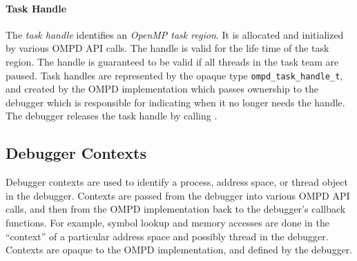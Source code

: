 \paragraph{Task Handle}
The \emph{task handle} identifies an \emph{OpenMP task region}.
It is allocated and initialized by various OMPD API calls.
The handle is valid for the life time of the task region.
The handle is guaranteed to be valid if all threads
in the task team are paused.
Task handles are represented by the opaque type
\texttt{ompd\_task\_handle\_t}, and created by the OMPD implementation
which passes ownership to the debugger which is responsible for
indicating when it no longer needs the handle.
The debugger releases the task handle by calling
.


\subsection{Debugger Contexts}
Debugger contexts are used to identify a process, address space, or thread 
object
in the debugger.
Contexts are passed from the debugger into various OMPD API calls,
and then from the OMPD implementation back to the debugger's
callback functions.
For example, symbol lookup and memory accesses are done in the ``context''
of a particular address space and possibly thread in the debugger.
Contexts are opaque to the OMPD implementation, and defined by the debugger.


